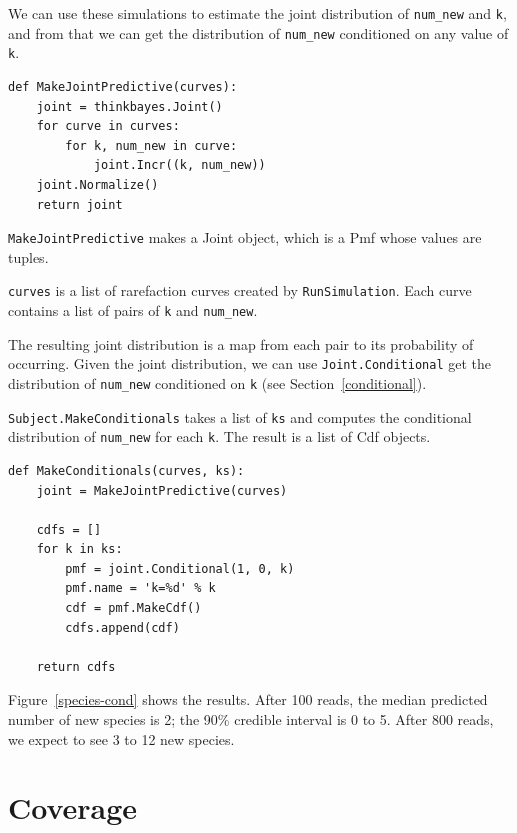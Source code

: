 \documentclass[12pt]{book}
\begin{document}
We can use these simulations to estimate the
joint distribution of \verb"num_new" and {\tt k}, and from that
we can get the distribution of \verb"num_new" conditioned on any
value of {\tt k}.

\begin{verbatim}
def MakeJointPredictive(curves):
    joint = thinkbayes.Joint()
    for curve in curves:
        for k, num_new in curve:
            joint.Incr((k, num_new))
    joint.Normalize()
    return joint
\end{verbatim}

{\tt MakeJointPredictive} makes a Joint object, which is a
Pmf whose values are tuples.

{\tt curves} is a list of rarefaction curves created by
{\tt RunSimulation}.  Each curve contains a list of pairs of
{\tt k} and \verb"num_new".

The resulting joint distribution is a map from each pair to
its probability of occurring.  Given the joint distribution, we
can use {\tt Joint.Conditional}
get the distribution of \verb"num_new" conditioned on {\tt k}
(see Section~\ref{conditional}).

{\tt Subject.MakeConditionals} takes a list of {\tt ks}
and computes the conditional distribution of \verb"num_new"
for each {\tt k}.  The result is a list of Cdf objects.

\begin{verbatim}
def MakeConditionals(curves, ks):
    joint = MakeJointPredictive(curves)

    cdfs = []
    for k in ks:
        pmf = joint.Conditional(1, 0, k)
        pmf.name = 'k=%d' % k
        cdf = pmf.MakeCdf()
        cdfs.append(cdf)

    return cdfs
\end{verbatim}

Figure~\ref{species-cond} shows the results.  After 100 reads, the
median predicted number of new species is 2; the 90\% credible
interval is 0 to 5.  After 800 reads, we expect to see 3 to 12 new
species.


\section{Coverage}
\end{document}
